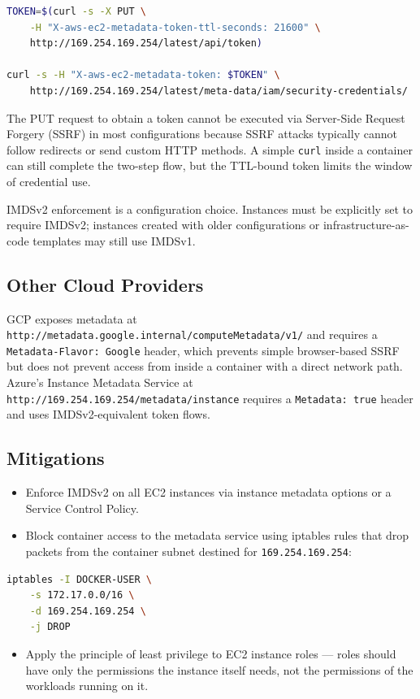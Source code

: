 \begin{lstlisting}[language=bash]
TOKEN=$(curl -s -X PUT \
    -H "X-aws-ec2-metadata-token-ttl-seconds: 21600" \
    http://169.254.169.254/latest/api/token)

curl -s -H "X-aws-ec2-metadata-token: $TOKEN" \
    http://169.254.169.254/latest/meta-data/iam/security-credentials/
\end{lstlisting}

The PUT request to obtain a token cannot be executed via Server-Side Request Forgery (SSRF) in most configurations because SSRF attacks typically cannot follow redirects or send custom HTTP methods. A simple \texttt{curl} inside a container can still complete the two-step flow, but the TTL-bound token limits the window of credential use.

IMDSv2 enforcement is a configuration choice. Instances must be explicitly set to require IMDSv2; instances created with older configurations or infrastructure-as-code templates may still use IMDSv1.

\subsection{Other Cloud Providers}

GCP exposes metadata at \texttt{http://metadata.google.internal/computeMetadata/v1/} and requires a \texttt{Metadata-Flavor: Google} header, which prevents simple browser-based SSRF but does not prevent access from inside a container with a direct network path. Azure's Instance Metadata Service at \texttt{http://169.254.169.254/metadata/instance} requires a \texttt{Metadata: true} header and uses IMDSv2-equivalent token flows.

\subsection{Mitigations}

\begin{itemize}
    \item Enforce IMDSv2 on all EC2 instances via instance metadata options or a Service Control Policy.
    \item Block container access to the metadata service using iptables rules that drop packets from the container subnet destined for \texttt{169.254.169.254}:
\end{itemize}

\begin{lstlisting}[language=bash]
iptables -I DOCKER-USER \
    -s 172.17.0.0/16 \
    -d 169.254.169.254 \
    -j DROP
\end{lstlisting}

\begin{itemize}
    \item Apply the principle of least privilege to EC2 instance roles --- roles should have only the permissions the instance itself needs, not the permissions of the workloads running on it.
\end{itemize}